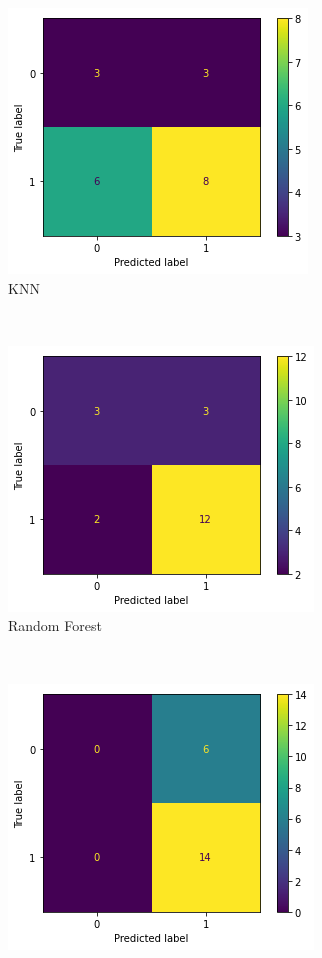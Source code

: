 \begin{figure}[htb] 
    \centering 
    \caption{Matrizes de confusão para classificadores aplicados sobre dados de seções para impacto total}
    \label{fig:base-de-dados-24.1-confusion-matrix-total-secao}
    \begin{subfigure}[b]{0.45\textwidth}
        \includegraphics[scale=0.75]{images/base-de-dados-24.3-confusion-matrix-knn-total-secao.png}
        \caption{KNN}
        \label{fig:resultados:base-de-dados-24.3-confusion-matrix-knn-total-secao}
    \end{subfigure} ~ \quad
    \begin{subfigure}[b]{0.45\textwidth}
        \includegraphics[scale=0.75]{images/base-de-dados-24.1-confusion-matrix-randomforest-total-secao.png}
        \caption{Random Forest}
        \label{fig:resultados:base-de-dados-24.1-confusion-matrix-randomforest-total-secao}
    \end{subfigure} \\
    \begin{subfigure}[b]{0.45\textwidth}
        \includegraphics[scale=0.75]{images/base-de-dados-24.1-confusion-matrix-logisticregression-total-secao.png}

\end{subfigure}
\end{figure}
